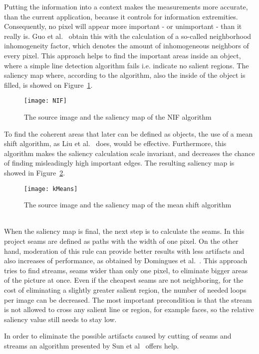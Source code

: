 \documentclass[draft,final]{vutinfth} %
\begin{document}
	Putting the information into a context makes the measurements more accurate, than the current application, because it controls for information extremities.
	Consequently, no pixel will appear more important - or unimportant - than it really is.
	Guo et al.~\cite{guo2015nif} obtain this with the calculation of a so-called neighborhood inhomogeneity factor, which denotes the amount of inhomogeneous neighbors of every pixel. 
	This approach helps to find the important areas inside an object, where a simple line detection algorithm fails i.e. indicate no salient regions.
	The saliency map where, according to the algorithm, also the inside of the object is filled, is showed on Figure~\ref{fig:nif}.
	\begin{figure}[H]
		\centering		
		\texttt{[image: NIF]}
		\caption{The source image and the saliency map of the NIF algorithm ~\cite{guo2015nif} }
		\label{fig:nif}
	\end{figure}
	To find the coherent areas that later can be defined as objects, the use of a mean shift algorithm, as Liu et al.~\cite{liu2006region} does, would be effective. 
	Furthermore, this algorithm makes the saliency calculation scale invariant, and decreases the chance of finding misleadingly high important edges.
	The resulting saliency map is showed in Figure~\ref{fig:kmean}.\par
	\begin{figure}[H]
		\centering		
		\texttt{[image: kMeans]}
		\caption{The source image and the saliency map of the mean shift algorithm ~\cite{liu2006region} }
		\label{fig:kmean}
	\end{figure} 
	When the saliency map is final, the next step is to calculate the seams.
	In this project seams are defined as paths with the width of one pixel.
	On the other hand, moderation of this rule can provide better results with less artifacts and also increases of performance, as obtained by Domingues et al.~\cite{domingues2010stream}.
	This approach tries to find streams, seams wider than only one pixel, to eliminate bigger areas of the picture at once.
	Even if the cheapest seams are not neighboring, for the cost of eliminating a slightly greater salient region, the number of needed loops per image can be decreased.
	The most important precondition is that the stream is not allowed to cross any salient line or region, for example faces, so the relative saliency value still needs to stay low. \par
	In order to eliminate the possible artifacts caused by cutting of seams and streams an algorithm presented by  Sun et al~\cite{sun2005image} offers help.
\end{document}
